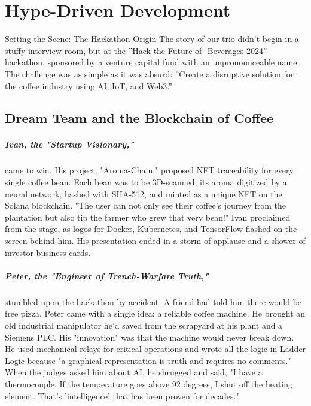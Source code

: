 \newpage
\chapter{Hype-Driven Development}
\label{ch:hype_driven}

\begin{navigationbox}{Setting the Scene: The Hackathon Origin}
The story of our trio didn’t begin in a stuffy interview room, but at the ”Hack-the-Future-of-
Beverages-2024” hackathon, sponsored by a venture capital fund with an unpronounceable
name. The challenge was as simple as it was absurd: ”Create a disruptive solution for the
coffee industry using AI, IoT, and Web3.”
\end{navigationbox}

\section{Dream Team and the Blockchain of Coffee}
\label{sec:parable_dream_team}



\paragraph{Ivan, the "Startup Visionary,"} came to win. His project, "Aroma-Chain," proposed NFT traceability for every single coffee bean. Each bean was to be 3D-scanned, its aroma digitized by a neural network, hashed with SHA-512, and minted as a unique NFT on the Solana blockchain. "The user can not only see their coffee's journey from the plantation but also tip the farmer who grew that very bean!" Ivan proclaimed from the stage, as logos for Docker, Kubernetes, and TensorFlow flashed on the screen behind him. His presentation ended in a storm of applause and a shower of investor business cards.

\paragraph{Peter, the "Engineer of Trench-Warfare Truth,"} stumbled upon the hackathon by accident. A friend had told him there would be free pizza. Peter came with a single idea: a reliable coffee machine. He brought an old industrial manipulator he'd saved from the scrapyard at his plant and a Siemens PLC. His "innovation" was that the machine would never break down. He used mechanical relays for critical operations and wrote all the logic in Ladder Logic because "a graphical representation is truth and requires no comments." When the judges asked him about AI, he shrugged and said, "I have a thermocouple. If the temperature goes above 92 degrees, I shut off the heating element. That's 'intelligence' that has been proven for decades."

